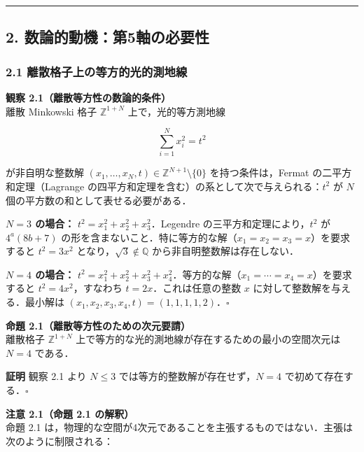 \documentclass[a4paper,11pt]{ltjsarticle}
\theoremstyle{definition}
\begin{document}
\begin{center}\rule{0.5\linewidth}{0.5pt}\end{center}

\subsection{2. 数論的動機：第5軸の必要性}\label{ux6570ux8ad6ux7684ux52d5ux6a5fux7b2c5ux8ef8ux306eux5fc5ux8981ux6027}

\subsubsection{2.1 離散格子上の等方的光的測地線}\label{ux96e2ux6563ux683cux5b50ux4e0aux306eux7b49ux65b9ux7684ux5149ux7684ux6e2cux5730ux7dda}

\textbf{観察 2.1（離散等方性の数論的条件）}\\
離散 Minkowski 格子 \(\mathbb{Z}^{1+N}\) 上で，光的等方測地線

\[\sum_{i=1}^{N} x_i^2 = t^2 \tag{2.1}\]

が非自明な整数解 \((x_1, \ldots, x_N, t) \in \mathbb{Z}^{N+1} \setminus \{0\}\) を持つ条件は，Fermat の二平方和定理（Lagrange の四平方和定理を含む）の系として次で与えられる：\(t^2\) が \(N\) 個の平方数の和として表せる必要がある．

\textbf{\(N = 3\) の場合：} \(t^2 = x_1^2 + x_2^2 + x_3^2\)．Legendre の三平方和定理により，\(t^2\) が \(4^a(8b+7)\) の形を含まないこと．特に等方的な解（\(x_1 = x_2 = x_3 = x\)）を要求すると \(t^2 = 3x^2\) となり，\(\sqrt{3} \notin \mathbb{Q}\) から非自明整数解は存在しない．

\textbf{\(N = 4\) の場合：} \(t^2 = x_1^2 + x_2^2 + x_3^2 + x_4^2\)．等方的な解（\(x_1 = \cdots = x_4 = x\)）を要求すると \(t^2 = 4x^2\)，すなわち \(t = 2x\)．これは任意の整数 \(x\) に対して整数解を与える．最小解は \((x_1, x_2, x_3, x_4, t) = (1,1,1,1,2)\)．\(\square\)

\textbf{命題 2.1（離散等方性のための次元要請）}\\
離散格子 \(\mathbb{Z}^{1+N}\) 上で等方的な光的測地線が存在するための最小の空間次元は \(N = 4\) である．

\textbf{証明} 観察 2.1 より \(N \leq 3\) では等方的整数解が存在せず，\(N = 4\) で初めて存在する．\(\square\)

\textbf{注意 2.1（命題 2.1 の解釈）}\\
命題 2.1 は，物理的な空間が4次元であることを主張するものではない．主張は次のように制限される：
\end{document}
